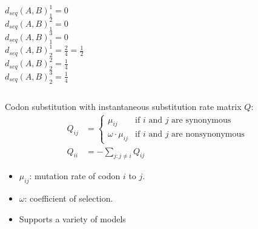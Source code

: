 \documentclass[aspectratio=169,font=14pt]{beamer}
\begin{document}
\begin{frame}[noframenumbering] %
\centering{\resizebox{0.85\linewidth}{!}{%

}}

\vspace{1em}
\begin{columns}
$d_{seq}(A,B)^1_1=0$ \\
$d_{seq}(A,B)^2_1=0$ \\
$d_{seq}(A,B)^3_1=0$ \\
$d_{seq}(A,B)^1_2=\frac{2}{4}=\frac{1}{2}$ \\
$d_{seq}(A,B)^2_2=\frac{1}{4}$ \\
$d_{seq}(A,B)^3_2=\frac{1}{4}$ \\
\end{columns}
\end{frame} %

\begin{frame}[noframenumbering] %
Codon substitution with instantaneous substitution rate matrix $Q$:
\vspace{1em}
\begin{align*} Q_{ij} &= \begin{cases}
    \mu_{ij} & \text{if $i$ and $j$ are synonymous}\\
    \omega \cdot \mu_{ij} & \text{if $i$ and $j$ are nonsynonymous}
    \end{cases}\\[10pt]
   Q_{ii} &= -\sum_{j:j \neq i} Q_{ij}
\end{align*}
\begin{itemize}
	\item $\mu_{ij}$: mutation rate of codon $i$ to $j$.
	\item $\omega$: coefficient of selection.
	\item Supports a variety of models %
\end{itemize}
\end{frame} %
\end{document}
